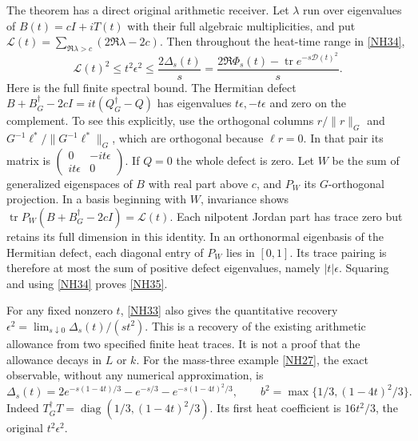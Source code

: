 \documentclass[11pt]{article}
\newcommand{\tr}{\operatorname{tr}}\newcommand{\dd}{\dagger_G}
\newcommand{\eps}{\epsilon}\newcommand{\spec}{\operatorname{spec}}
\begin{document}
The theorem has a direct original arithmetic receiver.
Let \(\lambda\) run over eigenvalues of \(B(t)=cI+iT(t)\)
with their full algebraic multiplicities, and put
\(\mathcal L(t)=\sum_{\Re\lambda>c}(2\Re\lambda-2c)\).
Then throughout the heat-time range in \eqref{NH34},
\begin{equation}\tag{NH35}\label{NH35}
\mathcal L(t)^2\le t^2\eps^2
\le\frac{2\Delta_s(t)}s
=\frac{2\Re\Phi_s(t)-\tr e^{-s\mathscr D(t)^2}}s .
\end{equation}
Here is the full finite spectral bound.
The Hermitian defect
\(B+B^\dd-2cI=it(Q^\dd-Q)\) has eigenvalues
\(t\eps,-t\eps\) and zero on the complement.
To see this explicitly, use the orthogonal columns
\(r/\|r\|_G\) and
\(G^{-1}\ell^*/\|G^{-1}\ell^*\|_G\), which are orthogonal
because \(\ell r=0\).
In that pair its matrix is
\(\left(\begin{smallmatrix}0&-it\eps\\it\eps&0\end{smallmatrix}\right)\).
If \(Q=0\) the whole defect is zero.
Let \(W\) be the sum of generalized eigenspaces of \(B\)
with real part above \(c\), and \(P_W\) its
\(G\)-orthogonal projection.
In a basis beginning with \(W\), invariance shows
\(\tr P_W(B+B^\dd-2cI)=\mathcal L(t)\).
Each nilpotent Jordan part has trace zero but retains
its full dimension in this identity.
In an orthonormal eigenbasis of the Hermitian defect,
each diagonal entry of \(P_W\) lies in \([0,1]\).
Its trace pairing is therefore at most the sum of
positive defect eigenvalues, namely \(|t|\eps\).
Squaring and using \eqref{NH34} proves \eqref{NH35}.

For any fixed nonzero \(t\), \eqref{NH33} also gives
the quantitative recovery
\(\eps^2=\lim_{s\downarrow0}\Delta_s(t)/(st^2)\).
This is a recovery of the existing arithmetic allowance
from two specified finite heat traces. It is not a
proof that the allowance decays in \(L\) or \(k\).
For the mass-three example \eqref{NH27}, the exact
observable, without any numerical approximation, is
\begin{equation}\tag{NH36}\label{NH36}
\Delta_s(t)=
2e^{-s(1-4t)/3}-e^{-s/3}
-e^{-s(1-4t)^2/3},\qquad
b^2=\max\{1/3,(1-4t)^2/3\}.
\end{equation}
Indeed \(T^\dd T=\operatorname{diag}(1/3,(1-4t)^2/3)\).
Its first heat coefficient is \(16t^2/3\), the
original \(t^2\eps^2\).
\end{document}
